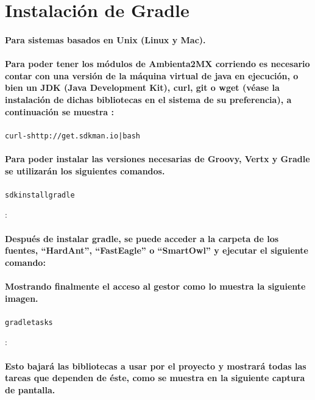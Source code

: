 %
%

\newpage
\section*{Instalación de Gradle}
	\paragraph{Para sistemas basados en Unix (Linux y Mac).}
	\paragraph{Para poder tener los módulos de Ambienta2MX corriendo es necesario contar con una versión de la máquina virtual de java en ejecución, o bien un JDK (Java Development Kit), curl, git o wget (véase la instalación de dichas bibliotecas en el sistema de su preferencia), a continuación se muestra :}
	\begin{alltt}
		curl -s http://get.sdkman.io | bash
	\end{alltt}
	\paragraph{Para poder instalar las versiones necesarias de Groovy, Vertx y Gradle se utilizarán los siguientes comandos.}
	\begin{alltt}
		sdk install gradle
	\end{alltt}:
	\paragraph{Después de instalar gradle, se puede acceder a la carpeta de los fuentes, ``HardAnt'', ``FastEagle'' o ``SmartOwl'' y ejecutar el siguiente comando:}
	\paragraph{Mostrando finalmente el acceso al gestor como lo muestra la siguiente imagen.}
	\begin{alltt}
		gradle tasks
	\end{alltt}:
	\paragraph{Esto bajará las bibliotecas a usar por el proyecto y mostrará todas las tareas que dependen de éste, como se muestra en la siguiente captura de pantalla.}
